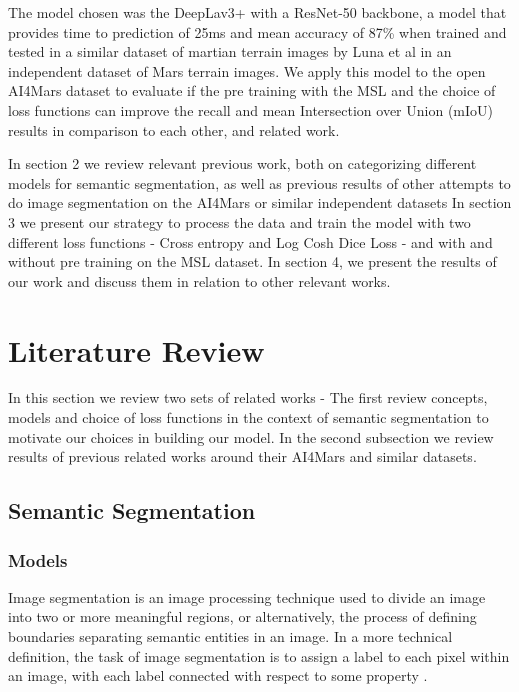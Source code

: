 \documentclass[10pt, conference]{IEEEtran}
\begin{document}
The model chosen was the DeepLav3+ with a ResNet-50 backbone, a model that provides
time to prediction of 25ms and mean accuracy of 87\% when trained and tested in a similar dataset of
martian terrain images by Luna et al \cite{Luna2025}
in an independent dataset of Mars terrain images. We apply this model to the open AI4Mars dataset
to evaluate if the pre training with the MSL and the choice of loss functions can improve the recall
and mean Intersection over Union (mIoU) results in comparison to each other, and related work.

In section 2 we review relevant previous work, both on categorizing different models for
semantic segmentation, as well as previous results of other attempts to do image segmentation on
the AI4Mars or similar independent datasets
In section 3 we present our strategy to process the data and train the model with two different loss
functions - Cross entropy and Log Cosh Dice Loss - and with and without pre training on the MSL dataset.
In section 4, we present the results of our work and discuss them in relation to other relevant works.

\section{Literature Review}

In this section we review two sets of related works - The first review concepts, models and
choice of loss functions in the context of semantic segmentation to motivate our choices in building
our model. In the second subsection we review results of previous related works around their
AI4Mars and similar datasets.

\subsection{Semantic Segmentation}

\subsubsection{Models}

Image segmentation is an image processing technique used to divide an 
image into two or more meaningful regions, or alternatively, the process 
of defining boundaries separating semantic entities in an image. In a 
more technical definition, the task of image segmentation is to assign 
a label to each pixel within an image, with each label connected with 
respect to some property \cite{Ghosh2019}.
\end{document}
